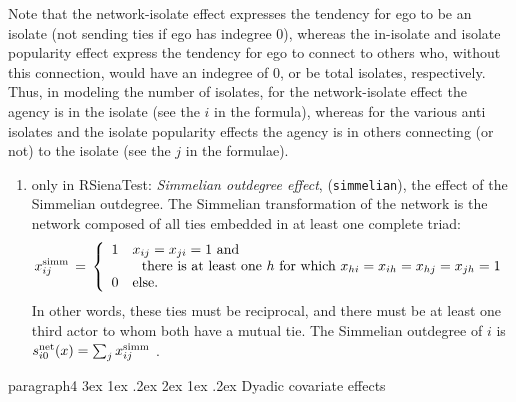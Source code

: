 \documentclass[a4paper,fleqn,11pt]{article}
\makeatletter
\renewcommand\paragraph{\@startsection
   {paragraph}{4}{\z@}               %
   {3ex \@plus1ex \@minus.2ex}       %
   {2ex \@plus1ex \@minus.2ex}       %
   {\normalfont\normalsize\bfseries\itshape}}   %
\newcommand{\+}{\, + \,}
\newcommand{\vit}{\theenumi}
\newcounter{savenumi}
\makeatother
\begin{document}
      Note that the network-isolate effect expresses the tendency for ego
      to be an isolate (not sending ties if ego has indegree 0),
      whereas the in-isolate and
      isolate popularity effect express the tendency for ego
      to connect to others who, without this connection, would
      have an indegree of 0, or be total isolates, respectively.
      Thus, in modeling the number of isolates, for the network-isolate
      effect the agency is in the isolate (see the $i$ in the formula),
      whereas for the various anti isolates and the isolate popularity
      effects the agency is in others connecting (or not)
      to the isolate (see the $j$ in the formulae).

\begin{enumerate}
\setcounter{enumi}{\value{savenumi}}
\item only in \textsf{RSienaTest}: \emph{Simmelian outdegree effect}, (\texttt{simmelian}), the effect of
      the Simmelian outdegree. The Simmelian transformation of the network is
      the network composed of all ties embedded in at least one complete triad:
\[
    x^{\rm{simm}}_{ij} \,=\, \left\{ \begin{array}{cl}
                               1 & x_{ij} = x_{ji} = 1 \text{ and} \\
                                  & \ \text{ there is at least one }
                                      h \text{ for which } x_{hi} = x_{ih} = x_{hj} = x_{jh} = 1 \\
                               0 & \text{else.}
                             \end{array} \right.
\]
      In other words, these ties must be reciprocal, and there must be at least one
      third actor to whom both have a mutual tie.
      The Simmelian outdegree of $i$ is  \\
$s^{\rm net}_{i\vit}(x ) = \sum_j  x^{\rm{simm}}_{ij} $ .\\

\setcounter{savenumi}{\value{enumi}}
\end{enumerate}

\paragraph{Dyadic covariate effects}
\end{document}
